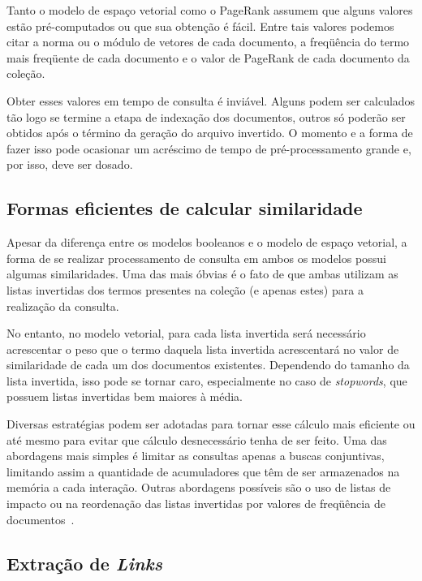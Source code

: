 \documentclass[10pt,twocolumn]{article}
\begin{document}
Tanto o modelo de espaço vetorial como o PageRank assumem que alguns
valores estão pré-computados ou que sua obtenção é fácil. Entre tais
valores podemos citar a norma ou o módulo de vetores de cada documento,
a freqüência do termo mais freqüente de cada documento e o valor de
PageRank de cada documento da coleção.

Obter esses valores em tempo de consulta é inviável. Alguns podem ser
calculados tão logo se termine a etapa de indexação dos
documentos, outros só poderão ser obtidos após o término da geração do
arquivo invertido. O momento e a forma de fazer isso pode ocasionar um
acréscimo de tempo de pré-processamento grande e, por isso, deve ser
dosado.

\subsection{Formas eficientes de calcular similaridade}

Apesar da diferença entre os modelos booleanos e o modelo de espaço
vetorial, a forma de se realizar processamento de consulta em ambos os
modelos possui algumas similaridades. Uma das mais óbvias é o fato de
que ambas utilizam as listas invertidas dos termos presentes na coleção
(e apenas estes) para a realização da consulta.

No entanto, no modelo vetorial, para cada lista invertida será
necessário acrescentar o peso que o termo daquela lista invertida
acrescentará no valor de similaridade de cada um dos documentos
existentes. Dependendo do tamanho da lista invertida, isso pode se
tornar caro, especialmente no caso de \emph{stopwords}, que possuem
listas invertidas bem maiores à média.

Diversas estratégias podem ser adotadas para tornar esse cálculo mais
eficiente ou até mesmo para evitar que cálculo desnecessário tenha de
ser feito. Uma das abordagens mais simples é limitar as consultas apenas
a buscas conjuntivas, limitando assim a quantidade de acumuladores que
têm de ser armazenados na memória a cada interação. Outras abordagens
possíveis são o uso de listas de impacto ou na reordenação das
listas invertidas por valores de freqüência de
documentos~\cite{moffat1999managing, persin1996frequency}.

\subsection{Extração de \emph{Links}}
\end{document}
